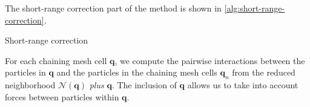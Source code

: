The short-range correction part of the \PThreeM{} method is shown in \autoref{alg:short-range-correction}.
\begin{algorithm}
    \caption{Short-range correction}\label{alg:short-range-correction}
    \begin{algorithmic}[1]
        \Break
        \EndIf
        \State {}
        \EndFor
        \EndFor
        \EndFor
        \EndFor
    \end{algorithmic}
\end{algorithm}
For each chaining mesh cell $\mathbf{q}$, we compute the pairwise interactions between the particles in $\mathbf{q}$ and the particles in the chaining mesh cells $\mathbf{q}_n$ from the reduced neighborhood $\mathcal{N}(\mathbf{q})$ \textit{plus} $\mathbf{q}$.
The inclusion of $\mathbf{q}$ allows us to take into account forces between particles within $\mathbf{q}$.

